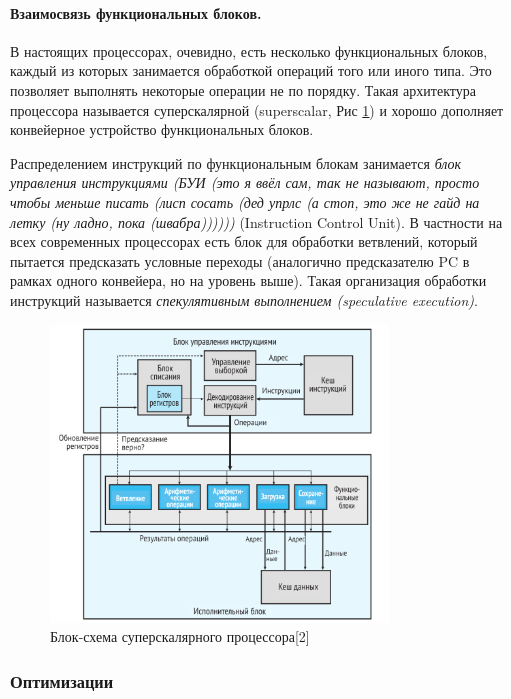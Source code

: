 \documentclass[12pt,a4paper]{article}
\begin{document}
\paragraph{Взаимосвязь функциональных блоков.}
\indent

В настоящих процессорах, очевидно, есть несколько функциональных блоков, каждый из которых занимается обработкой операций того или иного типа. Это позволяет выполнять некоторые операции не по порядку. Такая архитектура процессора называется суперскалярной (superscalar, Рис \ref{fig:superscalar}) и хорошо дополняет конвейерное устройство функциональных блоков.

Распределением инструкций по функциональным блокам занимается \textit{блок управления инструкциями (БУИ (это я ввёл сам, так не называют, просто чтобы меньше писать (лисп сосать (дед упрлс (а стоп, это же не гайд на летку (ну ладно, пока (швабра))))))} (Instruction Control Unit). В частности на всех современных процессорах есть блок для обработки ветвлений, который пытается предсказать условные переходы (аналогично предсказателю PC в рамках одного конвейера, но на уровень выше). Такая организация обработки инструкций называется \textit{спекулятивным выполнением (speculative execution)}.

\begin{figure}[ht!]
    \centering
    \includegraphics[width=0.8\textwidth]{supscalar.png}
    \caption{Блок-схема суперскалярного процессора[2]}
    \label{fig:superscalar}
\end{figure}


\subsubsection{Оптимизации}
\end{document}
